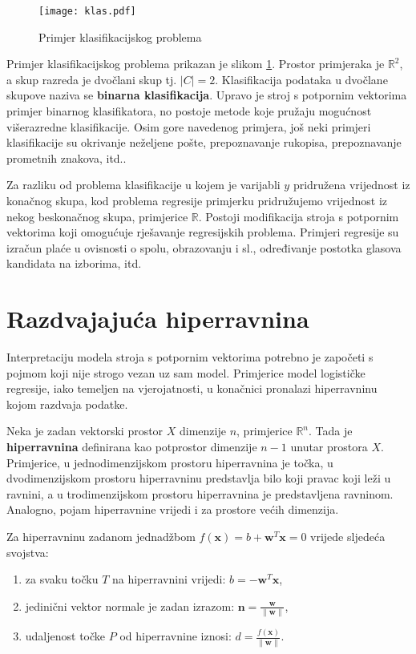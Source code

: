 \documentclass[times, utf8, zavrsni, numeric]{fer}
\begin{document}
\begin{figure}
\centering
\texttt{[image: klas.pdf]}
\caption{Primjer klasifikacijskog problema}
\label{fig:klas}
\end{figure}


\par Primjer klasifikacijskog problema prikazan je slikom \ref{fig:klas}. 
Prostor primjeraka je $\mathbb{R}^2$, a skup razreda je dvočlani skup tj. $\left\vert{C}\right\vert=2$.
Klasifikacija podataka u dvočlane skupove naziva se \textbf{binarna klasifikacija}.
Upravo je stroj s potpornim vektorima primjer binarnog klasifikatora, no postoje metode koje pružaju mogućnost
višerazredne klasifikacije.
Osim gore navedenog primjera, još neki primjeri klasifikacije su okrivanje neželjene pošte, prepoznavanje rukopisa,
prepoznavanje prometnih znakova, itd..

\par Za razliku od problema klasifikacije u kojem je varijabli $y$ pridružena vrijednost iz konačnog skupa, 
kod problema regresije primjerku pridružujemo vrijednost iz nekog beskonačnog skupa, primjerice $\mathbb{R}$.
Postoji modifikacija stroja s potpornim vektorima koji omogućuje rješavanje regresijskih problema.
Primjeri regresije su izračun plaće u ovisnosti o spolu, obrazovanju i sl., određivanje postotka glasova
kandidata na izborima, itd.

\section{Razdvajajuća hiperravnina} \label{hmargine}
Interpretaciju modela stroja s potpornim vektorima potrebno je započeti s pojmom koji nije strogo vezan uz sam model.
Primjerice model logističke regresije, iako temeljen na vjerojatnosti, u konačnici pronalazi hiperravninu kojom razdvaja
podatke.

\par Neka je zadan vektorski prostor $\textit{X}$ dimenzije $n$, primjerice $\mathbb{R}^n$.
Tada je \textbf{hiperravnina} definirana kao potprostor dimenzije $n-1$ unutar prostora $\textit{X}$.
Primjerice, u jednodimenzijskom prostoru hiperravnina je točka, u dvodimenzijskom prostoru
 hiperravninu predstavlja bilo koji pravac koji leži u ravnini, a u trodimenzijskom prostoru hiperravnina
 je predstavljena ravninom. 
Analogno, pojam hiperravnine vrijedi i za prostore većih dimenzija. 

\par Za hiperravninu zadanom jednadžbom $f(\mathbf{x})=b + \mathbf{w}^T\mathbf{x} = 0$ 
vrijede sljedeća svojstva:
\begin{enumerate}
  \item za svaku točku $T$ na hiperravnini vrijedi: $b = -\mathbf{w}^T\mathbf{x}$,
  \item jedinični vektor normale je zadan izrazom: $\mathbf{n} = \frac{\mathbf{w}}{\|\mathbf{w}\|}$,
  \item udaljenost točke $P$ od hiperravnine iznosi: $d = \frac{f(\mathbf{x})}{\|\mathbf{w}\|}$.
\end{enumerate}
\end{document}
